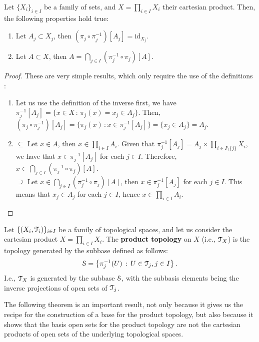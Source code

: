 \begin{lemma}
	\label{lem:projection}
	Let $\{X_i\}_{i\in I}$ be a family of sets, and $X=\prod_{i\in I} X_i$ their cartesian product.
	Then, the following properties hold true:
	\begin{enumerate}
		\item Let $A_j\subset X_j$, then $(\pi_j\circ\pi^{-1}_j)[A_j] = \text{id}_{X_j}$.
		\item Let $A\subset X$, then $A = \bigcap_{j\in I}(\pi_j^{-1}\circ\pi_j)[A]$.
	\end{enumerate}
\end{lemma}
\begin{proof}These are very simple results, which only require the use of the definitions :
	\begin{enumerate}
		\item Let us use the definition of the inverse first, we have $\pi_{j}^{-1}[A_j]=\{ x\in X\,:\,\pi_{j}(x)=x_j\in A_j\}$.
		Then, $(\pi_{j}\circ\pi_{j}^{-1})[A_j]=\{\pi_{j}(x)\,: x\in \pi_{j}^{-1}[A_j]\}=\{x_j\in A_j\} = A_j$.
		\item {$\boxed{\subseteq}$} Let $x\in A$, then $x\in \prod_{i\in I} A_i$. Given that $\pi_j^{-1}[A_j] = A_j\times\prod_{i\in I\setminus\{j\}}X_i$,
		we have that $x\in \pi_j^{-1}[A_j]$ for each $j\in I$. Therefore, $x\in \bigcap_{j\in I}(\pi_j^{-1}\circ\pi_j)[A]$.\\
		{$\boxed{\supseteq}$} Let $x \in \bigcap_{j\in I}(\pi_j^{-1}\circ\pi_j)[A]$, then $x\in \pi_j^{-1}[A_j]$ for each $j\in I$.
		This means that $x_j \in A_j$ for each $j\in I$, hence $x\in \prod_{i\in I} A_i$.
	\end{enumerate}
\end{proof}

\begin{definition}
	\label{def:product-topology}
	Let $\{(X_i, \T_i)\}_{i\in I}$ be a family of topological spaces, and
	let us consider the cartesian product $X=\prod_{i\in I} X_i$.
	The \textbf{product topology} on $X$ (i.e., $\T_{X}$) is the topology generated by the subbase
	defined as follows:
	$$
		\S = \setdef{\pi^{-1}_j(U)}{U\in\T_j, j\in I}.
	$$
	I.e., $\T_X$ is generated by the subbase $\S$, with the subbasis elements
	being the inverse projections of open sets of $\T_j$.
\end{definition}

The following theorem is an important result, not only because it gives us the recipe
for the construction of a base for the product topology, but also because it shows that
the basis open sets for the product topology are not the cartesian products of open sets
of the underlying topological spaces.

